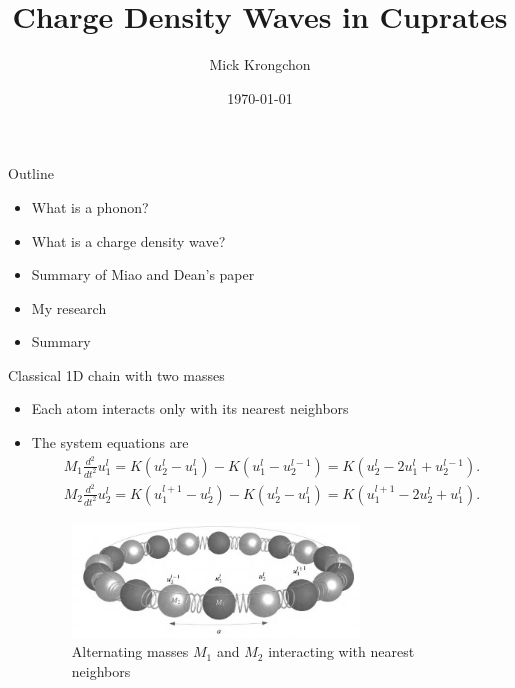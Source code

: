 \documentclass{beamer}
\title[]{Charge Density Waves in Cuprates}
\author{Mick Krongchon}
\institute{University of Illinois at Urbana-Champaign}
\date{\today}
\begin{document}
\begin{frame}
\titlepage
\end{frame}

\begin{frame}{Outline}
\begin{itemize}
\item What is a phonon?
\item What is a charge density wave?
\item Summary of Miao and Dean's paper
\item My research
\item Summary
\end{itemize}
\end{frame}

\begin{frame}{Classical 1D chain with two masses}
\begin{itemize}
\item Each atom interacts only with its nearest neighbors
\item The system equations are
\begin{align*}
M_1 \frac{d^2}{dt^2} u_1^l = K(u_2^l - u_1^l) - K(u_1^l - u_2^{l - 1}) = K(u_2^l - 2u_1^l + u_2^{l - 1}). \\
M_2 \frac{d^2}{dt^2} u_2^l = K(u_1^{l + 1} - u_2^l) - K(u_2^l - u_1^l) = K(u_1^{l + 1} - 2u_2^l + u_1^l).
\end{align*}
\begin{figure}
\includegraphics[width=3in]{figs/1d_diagram.png}
\caption{\label{fig:1d_diagram} Alternating masses $M_1$ and $M_2$ interacting with nearest neighbors}
\end{figure}
\end{itemize}
\end{frame}
\end{document}
